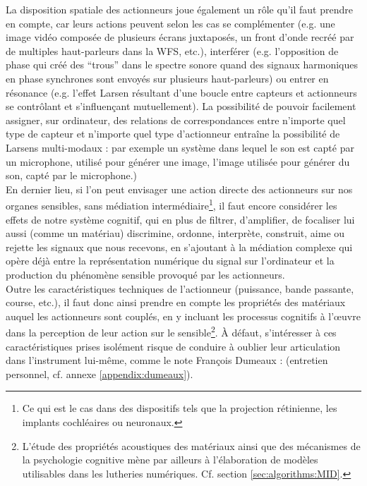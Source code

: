 \indent La disposition spatiale des actionneurs joue également un rôle qu'il faut prendre en compte, car leurs actions peuvent selon les cas se complémenter (e.g. une image vidéo composée de plusieurs écrans juxtaposés, un front d'onde recréé par de multiples haut-parleurs dans la \gls{WFS}, etc.), interférer (e.g. l'opposition de phase qui créé des ``trous'' dans le spectre sonore quand des signaux harmoniques en phase synchrones sont envoyés sur plusieurs haut-parleurs) ou entrer en résonance (e.g. l'effet Larsen résultant d'une boucle entre capteurs et actionneurs se contrôlant et s'influençant mutuellement). La possibilité de pouvoir facilement assigner, sur ordinateur, des relations de correspondances entre n'importe quel type de capteur et n'importe quel type d'actionneur entraîne la possibilité de Larsens multi-modaux : par exemple un système dans lequel le son est capté par un microphone, utilisé pour générer une image, l'image utilisée pour générer du son, capté par le microphone.)\\
\indent En dernier lieu, si l'on peut envisager une action directe des actionneurs sur nos organes sensibles, sans médiation intermédiaire\footnote{Ce qui est le cas dans des dispositifs tels que la projection rétinienne, les implants cochléaires ou neuronaux.}, il faut encore considérer les effets de notre système cognitif, qui en plus de filtrer, d'amplifier, de focaliser lui aussi (comme un matériau) discrimine, ordonne, interprète, construit, aime ou rejette les signaux que nous recevons, en s'ajoutant à la médiation complexe qui opère déjà entre la représentation numérique du signal sur l'ordinateur et la production du phénomène sensible provoqué par les actionneurs.\\
\indent Outre les caractéristiques techniques de l'actionneur (puissance, bande passante, course, etc.), il faut donc ainsi prendre en compte les propriétés des matériaux auquel les actionneurs sont couplés, en y incluant les processus cognitifs à l'œuvre dans la perception de leur action sur le sensible\footnote{L'étude des propriétés acoustiques des matériaux ainsi que des mécanismes de la psychologie cognitive mène par ailleurs à l'élaboration de modèles utilisables dans les lutheries numériques. Cf. section \ref{sec:algorithms:MID}.}. À défaut, s'intéresser à ces caractéristiques prises isolément risque de conduire à oublier leur articulation dans l'instrument lui-même, comme le note François Dumeaux :  (entretien personnel, cf. annexe \ref{appendix:dumeaux}).

